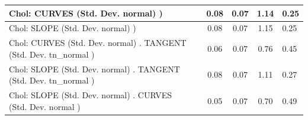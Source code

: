 \begin{table}
\begin{center}
\begin{tabular}{|l|l|c|c|c|l|}
			\hline
			 Chol: CURVES (Std. Dev. normal) ) &  & 0.08 & 0.07 & 1.14 & 0.25 \\
			\hline
			 Chol: SLOPE (Std. Dev. normal) ) &  & 0.08 & 0.07 & 1.15 & 0.25 \\
			\hline
			 Chol: CURVES (Std. Dev. normal) . TANGENT (Std. Dev.   tn_normal ) &  & 0.06 & 0.07 & 0.76 & 0.45 \\
			\hline
			 Chol: SLOPE (Std. Dev. normal) . TANGENT (Std. Dev.   tn_normal ) &  & 0.08 & 0.07 & 1.11 & 0.27 \\
			\hline
			 Chol: SLOPE (Std. Dev. normal) . CURVES (Std. Dev.   normal ) &  & 0.05 & 0.07 & 0.70 & 0.49 \\
			\hline
		\end{tabular}
	\end{center}
\end{table}